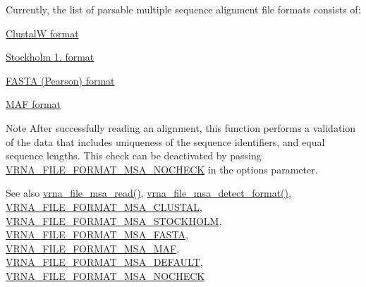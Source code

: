 Currently, the list of parsable multiple sequence alignment file formats consists of\+:
\begin{DoxyItemize}
\item \hyperlink{file_formats_msa-formats-clustal}{ClustalW format}
\item \hyperlink{file_formats_msa-formats-stockholm}{Stockholm 1. format}
\item \hyperlink{file_formats_msa-formats-fasta}{F\+A\+S\+TA (Pearson) format}
\item \hyperlink{file_formats_msa-formats-maf}{M\+AF format}
\end{DoxyItemize}\begin{DoxyNote}{Note}
After successfully reading an alignment, this function performs a validation of the data that includes uniqueness of the sequence identifiers, and equal sequence lengths. This check can be deactivated by passing \hyperlink{group__file__utils_ga229fb3778ecabea4782902b69fa48fd1}{V\+R\+N\+A\+\_\+\+F\+I\+L\+E\+\_\+\+F\+O\+R\+M\+A\+T\+\_\+\+M\+S\+A\+\_\+\+N\+O\+C\+H\+E\+CK} in the {\ttfamily options} parameter.
\end{DoxyNote}
\begin{DoxySeeAlso}{See also}
\hyperlink{group__file__utils_gad02d5d12bda54611c915a1019323b7be}{vrna\+\_\+file\+\_\+msa\+\_\+read()}, \hyperlink{group__file__utils_gade4fa8136ebb2d0f7eb3f8b59a8658e3}{vrna\+\_\+file\+\_\+msa\+\_\+detect\+\_\+format()}, \hyperlink{group__file__utils_ga79a23de2c7249f2cccd762e475c81859}{V\+R\+N\+A\+\_\+\+F\+I\+L\+E\+\_\+\+F\+O\+R\+M\+A\+T\+\_\+\+M\+S\+A\+\_\+\+C\+L\+U\+S\+T\+AL}, \hyperlink{group__file__utils_ga62be992445cd8ab2ad7a8fded944338b}{V\+R\+N\+A\+\_\+\+F\+I\+L\+E\+\_\+\+F\+O\+R\+M\+A\+T\+\_\+\+M\+S\+A\+\_\+\+S\+T\+O\+C\+K\+H\+O\+LM}, \hyperlink{group__file__utils_gacf6274a2c825f34e4131404665b00604}{V\+R\+N\+A\+\_\+\+F\+I\+L\+E\+\_\+\+F\+O\+R\+M\+A\+T\+\_\+\+M\+S\+A\+\_\+\+F\+A\+S\+TA}, \hyperlink{group__file__utils_gab3186d774c01570d2a47d0308eec4927}{V\+R\+N\+A\+\_\+\+F\+I\+L\+E\+\_\+\+F\+O\+R\+M\+A\+T\+\_\+\+M\+S\+A\+\_\+\+M\+AF}, \hyperlink{group__file__utils_ga4acc255373831856a8417b68de8a94c0}{V\+R\+N\+A\+\_\+\+F\+I\+L\+E\+\_\+\+F\+O\+R\+M\+A\+T\+\_\+\+M\+S\+A\+\_\+\+D\+E\+F\+A\+U\+LT}, \hyperlink{group__file__utils_ga229fb3778ecabea4782902b69fa48fd1}{V\+R\+N\+A\+\_\+\+F\+I\+L\+E\+\_\+\+F\+O\+R\+M\+A\+T\+\_\+\+M\+S\+A\+\_\+\+N\+O\+C\+H\+E\+CK}
\end{DoxySeeAlso}

